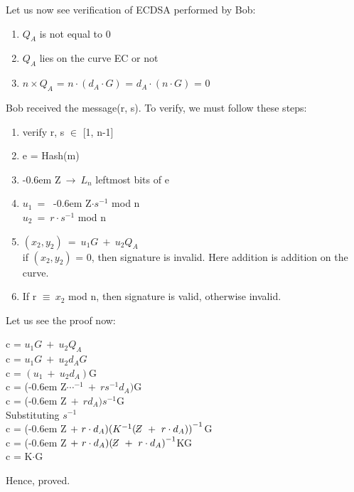 \documentclass[11pt]{article}
\newcommand{\zbar}{\raisebox{0.2ex}{--}\kern-0.6em Z}
\begin{document}
Let us now see verification of ECDSA performed by Bob:
\begin{enumerate}
    \item $Q_A$ is not equal to 0
    \item $Q_A$ lies on the curve EC or not
    \item $n\times Q_A$ = $n \cdot (d_A \cdot G)$ = $d_A \cdot (n \cdot G)$ = 0
\end{enumerate}
Bob received the message(r, s). To verify, we must follow these steps:
\begin{enumerate}
    \item verify r, s $\in$ [1, n-1]
    \item e = Hash(m)
    \item \zbar $\ \rightarrow\ L_n$ leftmost bits of e
    \item $u_1 \ =\ $ \zbar$\cdot s^{-1}$ mod n\\
    $u_2\ =\ r \cdot s^{-1}$ mod n
    \item $(x_2, y_2)\ =\ u_1G\ +\ u_2Q_A$\\
    if $(x_2, y_2)$ = 0, then signature is invalid. Here addition is addition on the curve.
    \item If r $\equiv\ x_2$ mod n, then signature is valid, otherwise invalid.
\end{enumerate}
Let us see the proof now:\\
\begin{center}
    c = $u_1G\ +\ u_2Q_A$\\
    c = $u_1G\ +\ u_2d_AG$\\
    c = $(u_1\ +\ u_2d_A)$G\\
    c = (\zbar$\cdots^{-1}\ +\ rs^{-1}d_A)$G\\
    c = (\zbar $\ +\ rd_A)s^{-1}$G\\
    Substituting $s^{-1}$\\
    c = (\zbar $\ +\ r\cdot d_A){(K^{-1}(\zbar\ +\ r\cdot d_A))}^{-1}$G\\
    c = (\zbar $\ +\ r\cdot d_A){(\zbar\ +\ r \cdot d_A)}^{-1}$KG\\
    c = K$\cdot$G
\end{center}
Hence, proved.
\end{document}

